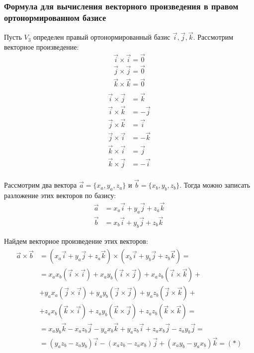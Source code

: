\subsubsection{Формула для вычисления векторного произведения в правом ортонормированном базисе}

Пусть $V_3$ определен правый ортонормированный базис $\vec{i}, \vec{j}, \vec{k}$. Рассмотрим векторное произведение:
\begin{align*}
  \vec{i} \times \vec{i} = \vec{0} \\
  \vec{j} \times \vec{j} = \vec{0} \\
  \vec{k} \times \vec{k} = \vec{0} \\
\end{align*}
\begin{align*}
  \vec{i} \times \vec{j} &=  \vec{k} \\
  \vec{i} \times \vec{k} &= -\vec{j} \\
  \vec{j} \times \vec{k} &=  \vec{i} \\
  \vec{j} \times \vec{i} &= -\vec{k} \\
  \vec{k} \times \vec{i} &=  \vec{j} \\
  \vec{k} \times \vec{j} &= -\vec{i} \\
\end{align*}

Рассмотрим два вектора $\vec{a} = \{x_a, y_a, z_a\}$ и $\vec{b} = \{x_b, y_b, z_b\}$. Тогда можно записать разложение этих векторов по базису:
\begin{align*}
  \vec{a} &= x_a \vec{i} + y_a \vec{j} + z_a \vec{k} \\
  \vec{b} &= x_b \vec{i} + y_b \vec{j} + z_b \vec{k}
\end{align*}

Найдем векторное произведение этих векторов:
\begin{gather*}
  \begin{split}
    \vec{a} \times \vec{b} &= (x_a \vec{i} + y_a \vec{j} + z_a \vec{k}) \times (x_b \vec{i} + y_b \vec{j} + z_b \vec{k}) =\\
     &= x_a x_b (\vec{i} \times \vec{i}) + x_a y_b (\vec{i} \times \vec{j}) + x_a z_b (\vec{i} \times \vec{k}) +\\
     &+ y_a x_a (\vec{j} \times \vec{i}) + y_a y_b (\vec{j} \times \vec{j}) + y_a z_b (\vec{j} \times \vec{k}) +\\
     &+ z_a x_b (\vec{k} \times \vec{i}) + z_a y_b (\vec{k} \times \vec{j}) + z_a z_b (\vec{k} \times \vec{k}) =\\
     &= x_a y_b \vec{k} - x_a z_b \vec{j} - y_a x_b \vec{k} + y_a z_b \vec{i} + z_a x_b \vec{j} - z_a y_b \vec{j} =\\
     &= (y_a z_b - z_a y_b) \vec{i} - (x_a z_b - z_a x_b) \vec{j} + (x_a y_b - y_a x_b) \vec{k} = \left( * \right) 
  \end{split}
\end{gather*} 

